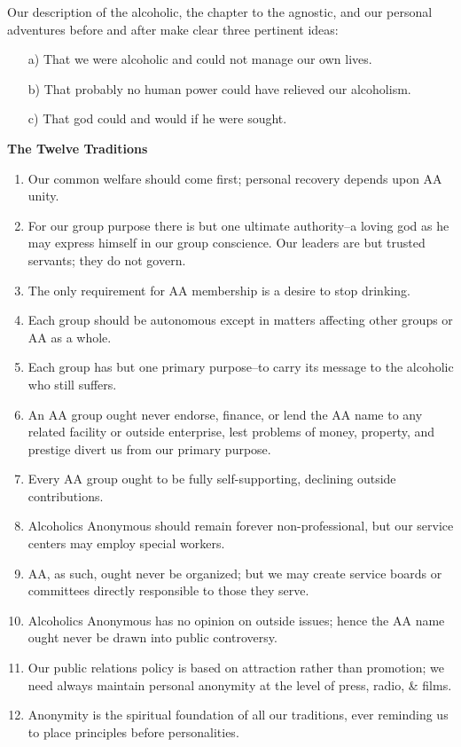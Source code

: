 \documentclass{beamer}
\begin{document}
\begin{frame}
Our  description  of  the  alcoholic,  the  chapter  to  the  agnostic,  and our personal adventures before and after make clear three pertinent ideas: 
\smallskip
\begin{itemize}
\item[a)] That  we  were  alcoholic  and  could  not  manage  our  own  lives.
\item[b)] That probably no human power could have relieved our alcoholism. 
\item[c)] That god could and would if he were sought. 
\end{itemize}
\end{frame}

\begin{frame}[plain]\scriptsize
\textcolor{example}{\textbf{The Twelve Traditions}}
\begin{enumerate}%
\item Our  common  welfare  should  come  first;  personal  recovery  depends upon AA unity. \item   For our group purpose there is but one ultimate authority--a loving  god  as  he  may  express  himself  in  our  group  conscience.  Our  leaders  are  but  trusted  servants;  they  do  not  govern.\item   The  only  requirement  for  AA  membership  is  a  desire  to  stop drinking. \item   Each group should be autonomous except in matters affecting other groups or AA as a whole. \item  Each  group  has  but  one  primary  purpose--to  carry  its  message to the alcoholic who still suffers. \item   An  AA  group  ought  never  endorse,  finance,  or  lend  the  AA  name  to  any  related  facility  or  outside  enterprise,  lest  problems  of  money,  property,  and  prestige  divert  us  from  our primary purpose. \item   Every AA group ought to be fully self-supporting, declining outside contributions. \item     Alcoholics     Anonymous     should     remain     forever          non-professional, but our service centers may employ special workers. \item    AA,  as  such,  ought  never  be  organized;  but  we  may  create  service  boards  or  committees  directly  responsible  to  those  they serve. \item  Alcoholics  Anonymous  has  no  opinion  on  outside  issues;  hence  the  AA  name  ought  never  be  drawn  into  public  controversy. \item Our public relations policy is based on attraction rather than promotion;  we  need  always  maintain  personal  anonymity  at  the level of press, radio, \& films. \item  Anonymity  is  the  spiritual  foundation  of  all  our  traditions,  ever reminding us to place principles before personalities. 
\end{enumerate}
\end{frame}
 
\end{document}
